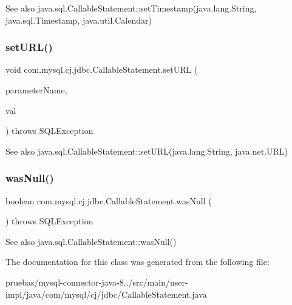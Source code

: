 \begin{DoxySeeAlso}{See also}
java.\+sql.\+Callable\+Statement\+::set\+Timestamp(java.\+lang.\+String, java.\+sql.\+Timestamp, java.\+util.\+Calendar) 
\end{DoxySeeAlso}
\mbox{\label{classcom_1_1mysql_1_1cj_1_1jdbc_1_1_callable_statement_ad9619f612112c6427341179cd909a058}} 
\subsubsection{\texorpdfstring{set\+U\+R\+L()}{setURL()}}
{\footnotesize\ttfamily void com.\+mysql.\+cj.\+jdbc.\+Callable\+Statement.\+set\+U\+RL (\begin{DoxyParamCaption}\item[{String}]{parameter\+Name,  }\item[{U\+RL}]{val }\end{DoxyParamCaption}) throws S\+Q\+L\+Exception}

\begin{DoxySeeAlso}{See also}
java.\+sql.\+Callable\+Statement\+::set\+U\+RL(java.\+lang.\+String, java.\+net.\+U\+RL) 
\end{DoxySeeAlso}
\mbox{\label{classcom_1_1mysql_1_1cj_1_1jdbc_1_1_callable_statement_a49a33a86678de625aaf3d944363eb7d5}} 
\subsubsection{\texorpdfstring{was\+Null()}{wasNull()}}
{\footnotesize\ttfamily boolean com.\+mysql.\+cj.\+jdbc.\+Callable\+Statement.\+was\+Null (\begin{DoxyParamCaption}{ }\end{DoxyParamCaption}) throws S\+Q\+L\+Exception}

\begin{DoxySeeAlso}{See also}
java.\+sql.\+Callable\+Statement\+::was\+Null() 
\end{DoxySeeAlso}


The documentation for this class was generated from the following file\+:\begin{DoxyCompactItemize}
\item 
pruebas/mysql-\/connector-\/java-\/8../src/main/user-\/impl/java/com/mysql/cj/jdbc/Callable\+Statement.\+java\end{DoxyCompactItemize}
